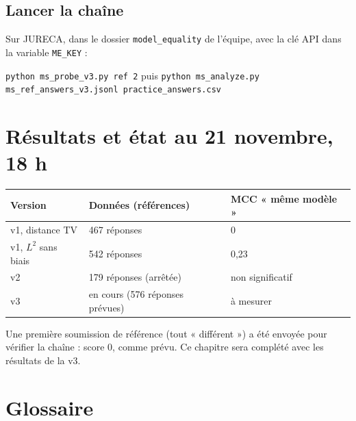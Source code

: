 \documentclass[11pt,a4paper]{report}
\theoremstyle{definition}
\theoremstyle{plain}
\newcommand{\code}[1]{\texttt{#1}}
\begin{document}
\section{Lancer la chaîne}

Sur JURECA, dans le dossier \code{model\_equality} de l'équipe, avec la clé API dans la variable \code{ME\_KEY} :
\begin{center}
\code{python ms\_probe\_v3.py ref 2} \quad puis \quad \code{python ms\_analyze.py ms\_ref\_answers\_v3.jsonl practice\_answers.csv}
\end{center}

\chapter{Résultats et état au 21 novembre, 18 h}

\begin{center}\small
\begin{tabular}{lll}
\toprule
Version & Données (références) & MCC « même modèle » \\
\midrule
v1, distance TV & 467 réponses & 0 \\
v1, $L^2$ sans biais & 542 réponses & 0,23 \\
v2 & 179 réponses (arrêtée) & non significatif \\
v3 & en cours (576 réponses prévues) & à mesurer \\
\bottomrule
\end{tabular}
\end{center}

Une première soumission de référence (tout « différent ») a été envoyée pour vérifier la chaîne : score 0, comme prévu. Ce chapitre sera complété avec les résultats de la v3.

\appendix

\chapter{Glossaire}
\end{document}
